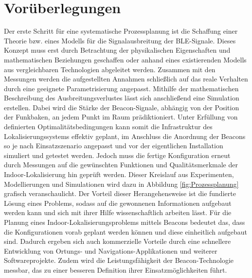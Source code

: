 \section{Vorüberlegungen}
Der erste Schritt für eine systematische Prozessplanung ist die Schaffung einer Theorie bzw. eines Modells für die Signalausbreitung der BLE-Signale. Dieses Konzept muss erst durch Betrachtung der physikalischen Eigenschaften und mathematischen Beziehungen geschaffen oder anhand eines existierenden Modells aus vergleichbaren Technologien abgeleitet werden. Zusammen mit den Messungen werden die aufgestellten Annahmen schließlich auf das reale Verhalten durch eine geeignete Parametrisierung angepasst. Mithilfe der mathematischen Beschreibung des Ausbreitungsverlustes lässt sich anschließend eine Simulation erstellen. Dabei wird die Stärke der Beacon-Signale, abhängig von der Position der Funkbaken, an jedem Punkt im Raum prädiktioniert. Unter Erfüllung von definierten Optimalitätsbedingungen kann somit die Infrastruktur des Lokalisierungssystems effektiv geplant, im Anschluss die Anordnung der Beacons so je nach Einsatzszenario angepasst und vor der eigentlichen Installation simuliert und getestet werden. Jedoch muss die fertige Konfiguration erneut durch Messungen auf die gewünschten Funktionen und Qualitätsmerkmale der Indoor-Lokalisierung hin geprüft werden. Dieser Kreislauf aus Experimenten, Modellierungen und Simulationen wird dazu in Abbildung \ref{fig:Prozessplanung} grafisch veranschaulicht. Der Vorteil dieser Herangehensweise ist die fundierte Lösung eines Problems, sodass auf die gewonnenen Informationen aufgebaut werden kann und sich mit ihrer Hilfe wissenschaftlich arbeiten lässt. Für die Planung eines Indoor-Lokalisierungsproblems mittels Beacons bedeutet das, dass die Konfigurationen vorab geplant werden können und diese einheitlich aufgebaut sind. Dadurch ergeben sich auch kommerzielle Vorteile durch eine schnellere Entwicklung von Ortungs- und Navigations-Applikationen und weiterer Softwareprojekte. Zudem wird die Leistungsfähigkeit der Beacon-Technologie messbar, das zu einer besseren Definition ihrer Einsatzmöglichkeiten führt.
